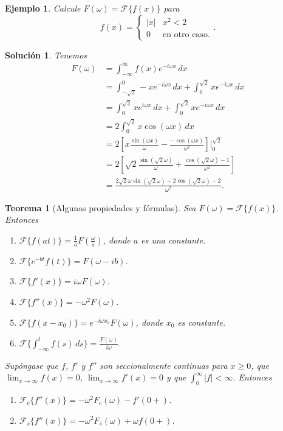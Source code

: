 \documentclass[11pt,letterpaper,draft]{report}
\newtheorem{theorem}[defn]{Teorema}
\newtheorem{example}[defn]{Ejemplo}
\newtheorem*{sol}{Solución}
\newcommand\<{\langle}
\renewcommand\>{\rangle}
\let\cal\mathcal
\begin{document}
\begin{example}
  Calcule $F(\omega)=\cal F\{f(x)\}$ para
  \[
    f(x)
    =
    \begin{cases}
      |x| & x^{2}<2 \\
      0 & \text{en otro caso.}
    \end{cases}
  .\]
\end{example}
\begin{sol}
  Tenemos
  \begin{align*}
    F(\omega)
    &= \int_{-\infty}^{\infty}f(x)e^{-i\omega x}\,dx \\
    &= \int_{-\sqrt 2}^{0}-xe^{-i\omega x}\,dx
      + \int_{0}^{\sqrt 2}xe^{-i\omega x}\,dx \\
    &= \int_{0}^{\sqrt 2}xe^{i\omega x}\,dx
      + \int_{0}^{\sqrt 2}xe^{-i\omega x}\,dx \\
    &= 2\int_{0}^{\sqrt 2}x\cos(\omega x)\,dx \\
    &= 2\left[
      x\frac{\sin(\omega x)}{\omega}-\frac{-\cos(\omega
      x)}{\omega^{2}}
    \right]\Big|_{0}^{\sqrt 2} \\
    &= 2\left[
      \sqrt 2\frac{\sin(\sqrt 2\omega)}{\omega}
      +\frac{\cos(\sqrt 2\omega)-1}{\omega^{2}}
    \right] \\
    &=
      \frac{2\sqrt 2\omega\sin(\sqrt 2\omega)+2\cos(\sqrt 2\omega)-2}
      {\omega^{2}}.
  \end{align*}
\end{sol}

\begin{theorem}[Algunas propiedades y fórmulas]
  Sea $F(\omega)=\cal F\{f(x)\}$.
  Entonces
  \begin{enumerate}
    \item $\cal F\{f(at)\}=\frac{1}{a}F(\frac{\omega}{a})$, donde $a$
      es una constante.
    \item $\cal F\{e^{-bt}f(t)\}=F(\omega-ib)$.
    \item $\cal F\{f'(x)\}=i\omega F(\omega)$.
    \item $\cal F\{f''(x)\}=-\omega^{2}F(\omega)$.
    \item $\cal F\{f(x-x_0)\}=e^{-i\omega x_0}F(\omega)$, donde $x_0$
      es constante.
    \item $\cal
      F\{\int_{-\infty}^{t}f(s)\,ds\}=\frac{F(\omega)}{i\omega}$.
  \end{enumerate}
  Supóngase que $f$, $f'$ y $f''$ son seccionalmente continuas para
  $x\geq 0$, que $\lim_{x\to\infty}f(x)=0$,
  $\lim_{x\to\infty}f'(x)=0$ y que $\int_{0}^{\infty}|f|<\infty$.
  Entonces
  \begin{enumerate}
    \item $\cal F_c\{f''(x)\}=-\omega^{2}F_c(\omega)-f'(0+)$.
    \item $\cal F_s\{f''(x)\}=-\omega^{2}F_s(\omega)+\omega f(0+)$.
  \end{enumerate}
\end{theorem}
\end{document}
